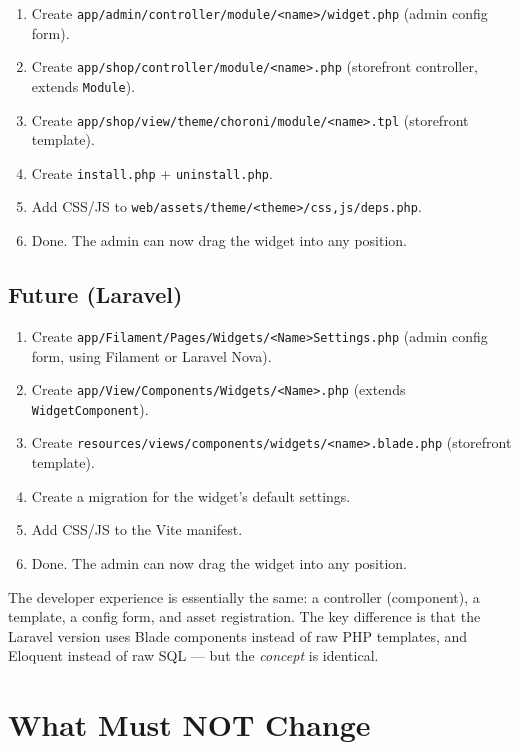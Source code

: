 \documentclass[11pt,a4paper]{article}
\begin{document}
\begin{enumerate}[leftmargin=1.6em,itemsep=2pt]
  \item Create \texttt{app/admin/controller/module/<name>/widget.php}
        (admin config form).
  \item Create
        \texttt{app/shop/controller/module/<name>.php} (storefront
        controller, extends \texttt{Module}).
  \item Create
        \texttt{app/shop/view/theme/choroni/module/<name>.tpl}
        (storefront template).
  \item Create \texttt{install.php} + \texttt{uninstall.php}.
  \item Add CSS/JS to \texttt{web/assets/theme/<theme>/{css,js}/deps.php}.
  \item Done. The admin can now drag the widget into any position.
\end{enumerate}

\subsection{Future (Laravel)}

\begin{enumerate}[leftmargin=1.6em,itemsep=2pt]
  \item Create \texttt{app/Filament/Pages/Widgets/<Name>Settings.php}
        (admin config form, using Filament or Laravel Nova).
  \item Create
        \texttt{app/View/Components/Widgets/<Name>.php} (extends
        \texttt{WidgetComponent}).
  \item Create
        \texttt{resources/views/components/widgets/<name>.blade.php}
        (storefront template).
  \item Create a migration for the widget's default settings.
  \item Add CSS/JS to the Vite manifest.
  \item Done. The admin can now drag the widget into any position.
\end{enumerate}

The developer experience is essentially the same: a controller
(component), a template, a config form, and asset registration. The
key difference is that the Laravel version uses Blade components
instead of raw PHP templates, and Eloquent instead of raw SQL --- but
the \emph{concept} is identical.

\section{What Must NOT Change}\label{sec:must-not-change}
\end{document}
